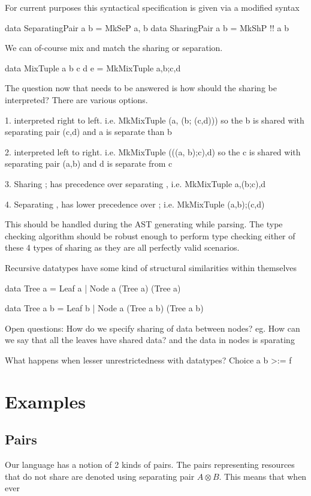 For current purposes this syntactical specification is given via a modified syntax

data SeparatingPair a b = MkSeP a, b
data SharingPair a b = MkShP !! a b

We can of-course mix and match the sharing or separation.

data MixTuple a b c d e = MkMixTuple a,b;c,d

The question now that needs to be answered is how should the sharing be interpreted?
There are various options.

1. interpreted right to left. i.e. MkMixTuple (a, (b; (c,d)))
   so the b is shared with separating pair (c,d) and a is separate than b

2. interpreted left to right. i.e. MkMixTuple (((a, b);c),d)
   so the c is shared with separating pair (a,b) and d is separate from c

3. Sharing ; has precedence over separating , i.e. MkMixTuple a,(b;c),d

4. Separating , has lower precedence over ; i.e. MkMixTuple (a,b);(c,d)

This should be handled during the AST generating while parsing.
The type checking algorithm should be robust enough
to perform type checking either of these 4 types of sharing as they are
all perfectly valid scenarios.

Recursive datatypes have some kind of structural similarities within themselves

data Tree a = Leaf a | Node a (Tree a) (Tree a)

data Tree a b = Leaf b | Node a (Tree a b) (Tree a b)

Open questions:
How do we specify sharing of data between nodes?
eg. How can we say that all the leaves have shared data? and the data in nodes is sparating


What happens when lesser unrestrictedness with datatypes? Choice a b >:= f


\section{Examples}

\subsection{Pairs}

Our language has a notion of 2 kinds of pairs. The pairs representing resources that do not share
are denoted using separating pair $A \otimes B$. This means that when ever 



